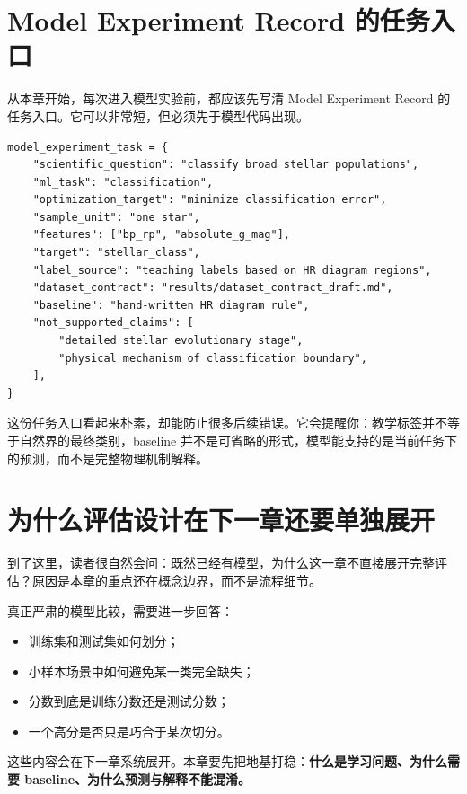 \section{Model Experiment Record 的任务入口}

从本章开始，每次进入模型实验前，都应该先写清 Model Experiment Record 的任务入口。它可以非常短，但必须先于模型代码出现。

\begin{examplebox}[任务入口的最小字段]
\begin{lstlisting}[style=pythonstyle]
model_experiment_task = {
    "scientific_question": "classify broad stellar populations",
    "ml_task": "classification",
    "optimization_target": "minimize classification error",
    "sample_unit": "one star",
    "features": ["bp_rp", "absolute_g_mag"],
    "target": "stellar_class",
    "label_source": "teaching labels based on HR diagram regions",
    "dataset_contract": "results/dataset_contract_draft.md",
    "baseline": "hand-written HR diagram rule",
    "not_supported_claims": [
        "detailed stellar evolutionary stage",
        "physical mechanism of classification boundary",
    ],
}
\end{lstlisting}
\end{examplebox}

这份任务入口看起来朴素，却能防止很多后续错误。它会提醒你：教学标签并不等于自然界的最终类别，baseline 并不是可省略的形式，模型能支持的是当前任务下的预测，而不是完整物理机制解释。

\section{为什么评估设计在下一章还要单独展开}

到了这里，读者很自然会问：既然已经有模型，为什么这一章不直接展开完整评估？原因是本章的重点还在概念边界，而不是流程细节。

真正严肃的模型比较，需要进一步回答：

\begin{itemize}
    \item 训练集和测试集如何划分；
    \item 小样本场景中如何避免某一类完全缺失；
    \item 分数到底是训练分数还是测试分数；
    \item 一个高分是否只是巧合于某次切分。
\end{itemize}

这些内容会在下一章系统展开。本章要先把地基打稳：\textbf{什么是学习问题、为什么需要 baseline、为什么预测与解释不能混淆。}

